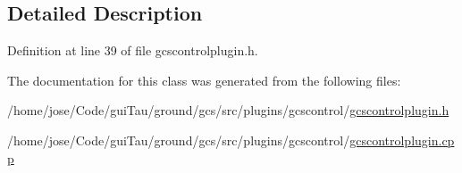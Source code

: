 \subsection{Detailed Description}


Definition at line 39 of file gcscontrolplugin.\-h.



The documentation for this class was generated from the following files\-:\begin{DoxyCompactItemize}
\item 
/home/jose/\-Code/gui\-Tau/ground/gcs/src/plugins/gcscontrol/\hyperlink{gcscontrolplugin_8h}{gcscontrolplugin.\-h}\item 
/home/jose/\-Code/gui\-Tau/ground/gcs/src/plugins/gcscontrol/\hyperlink{gcscontrolplugin_8cpp}{gcscontrolplugin.\-cpp}\end{DoxyCompactItemize}
